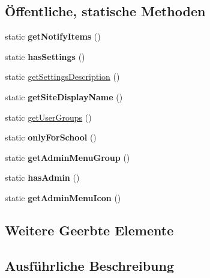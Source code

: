 \subsection*{Öffentliche, statische Methoden}
\begin{DoxyCompactItemize}
\item 
\mbox{\label{classhomeuseprogram_a15bc0a7a940c5167f253545fcf04735e}} 
static {\bfseries get\+Notify\+Items} ()
\item 
\mbox{\label{classhomeuseprogram_a330f0894733234da3fb701344e2172d9}} 
static {\bfseries has\+Settings} ()
\item 
static \mbox{\hyperlink{classhomeuseprogram_a1bb352f8474e0281f02662b7c83a52d7}{get\+Settings\+Description}} ()
\item 
\mbox{\label{classhomeuseprogram_a7e2bfb18f937a372fe6ff5714fc30f30}} 
static {\bfseries get\+Site\+Display\+Name} ()
\item 
static \mbox{\hyperlink{classhomeuseprogram_a1fcda408408207c103bf98519260d2c2}{get\+User\+Groups}} ()
\item 
\mbox{\label{classhomeuseprogram_a6c55eb4410654a15ea91a42cb9effc39}} 
static {\bfseries only\+For\+School} ()
\item 
\mbox{\label{classhomeuseprogram_a0976212d8ed89473e2a5082b31b96da8}} 
static {\bfseries get\+Admin\+Menu\+Group} ()
\item 
\mbox{\label{classhomeuseprogram_a5fd8946b1fec92e659ac782fda250ee3}} 
static {\bfseries has\+Admin} ()
\item 
\mbox{\label{classhomeuseprogram_ae28e050195c3495d34e2aa130c3f87b8}} 
static {\bfseries get\+Admin\+Menu\+Icon} ()
\end{DoxyCompactItemize}
\subsection*{Weitere Geerbte Elemente}


\subsection{Ausführliche Beschreibung}


